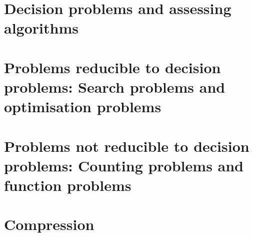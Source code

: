 \documentclass[oneside]{book}
\begin{document}
\part{Decision problems and assessing algorithms}








\part{Problems reducible to decision problems: Search problems and optimisation problems}



\part{Problems not reducible to decision problems: Counting problems and function problems}





\part{Compression}

\end{document}
